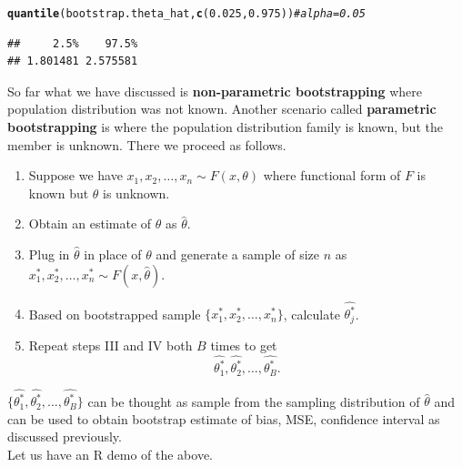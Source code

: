 \documentclass[11pt, a4paper]{article}\usepackage[]{graphicx}\usepackage[]{xcolor}
\makeatletter
\newcommand{\hlnum}[1]{\textcolor[rgb]{0.686,0.059,0.569}{#1}}%
\newcommand{\hlcom}[1]{\textcolor[rgb]{0.678,0.584,0.686}{\textit{#1}}}%
\newcommand{\hldef}[1]{\textcolor[rgb]{0.345,0.345,0.345}{#1}}%
\newcommand{\hlkwd}[1]{\textcolor[rgb]{0.737,0.353,0.396}{\textbf{#1}}}%
\newenvironment{kframe}{%
 \def\at@end@of@kframe{}%
 \ifinner\ifhmode%
  \def\at@end@of@kframe{\end{minipage}}%
  \begin{minipage}{\columnwidth}%
 \fi\fi%
 \def\FrameCommand##1{\hskip\@totalleftmargin \hskip-\fboxsep
 \colorbox{shadecolor}{##1}\hskip-\fboxsep
     \hskip-\linewidth \hskip-\@totalleftmargin \hskip\columnwidth}%
 \MakeFramed {\advance\hsize-\width
   \@totalleftmargin\z@ \linewidth\hsize
   \@setminipage}}%
 {\par\unskip\endMakeFramed%
 \at@end@of@kframe}
\newenvironment{knitrout}{}{} %
\makeatother
\begin{document}
\begin{knitrout}
\color{fgcolor}\begin{kframe}
\begin{alltt}
\hlkwd{quantile}\hldef{(bootstrap.theta_hat,} \hlkwd{c}\hldef{(}\hlnum{0.025}\hldef{,} \hlnum{0.975}\hldef{))} \hlcom{# alpha = 0.05}
\end{alltt}
\begin{verbatim}
##     2.5%    97.5% 
## 1.801481 2.575581
\end{verbatim}
\end{kframe}
\end{knitrout}


So far what we have discussed is \textbf{non-parametric bootstrapping} where population distribution was not known. Another scenario called \textbf{parametric bootstrapping} is where the population distribution family is known, but the member is unknown. There we proceed as follows.

\begin{enumerate}[Step I.]
\item Suppose we have $x_1, x_2, \ldots, x_n \sim F(x, \theta)$ where functional form of $F$ is known but $\theta$ is unknown.

\item Obtain an estimate of $\theta$ as $\hat{\theta}$.

\item Plug in $\hat{\theta}$ in place of $\theta$ and generate a sample of size $n$ as $x_1^*, x_2^*, \ldots, x_n^* \sim F(x, \hat{\theta})$.

\item Based on bootstrapped sample $\{x_1^*, x_2^*, \ldots, x_n^*\}$, calculate $\widehat{\theta_{j}^{*}}$.

\item Repeat steps III and IV both $B$ times to get $$\widehat{\theta_{1}^{*}}, \widehat{\theta_{2}^{*}}, \ldots, \widehat{\theta_{B}^{*}}.$$
\end{enumerate}

$\{\widehat{\theta_{1}^{*}}, \widehat{\theta_{2}^{*}}, \ldots, \widehat{\theta_{B}^{*}}\}$ can be thought as sample from the sampling distribution of $\hat{\theta}$ and can be used to obtain bootstrap estimate of bias, MSE, confidence interval as discussed previously. \\[0.3em]

Let us have an R demo of the above.
\end{document}
